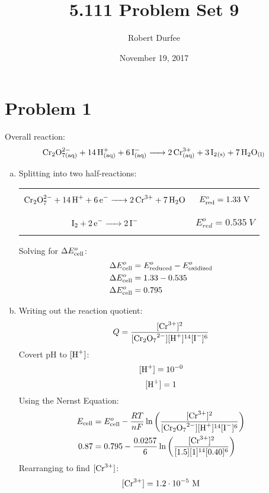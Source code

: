 \documentclass{article}
\title{ 5.111 Problem Set 9 }
\author{ Robert Durfee }
\date{ November 19, 2017 }
\begin{document}
\maketitle

\section*{ Problem 1 }

Overall reaction:
$$\ce{Cr_2O^{2-}_{7(aq)} + 14H^+_{(aq)} + 6I^-_{(aq)} -> 2Cr^{3+}_{(aq)} + 3I_2_{(s)} +
7H_2O_{(l)}}$$

\begin{enumerate}[a.]
    \item Splitting into two half-reactions:
        \begin{center}
            \begin{tabular}{c c}
                $$\ce{Cr_2O^{2-}_7 + 14H+ + 6e- -> 2Cr^{3+} + 7H_2O}$$ &
                $E^o_{\rm{red}}=1.33\ \si{V}$ \\
                $$\ce{I_2 + 2e- -> 2I^- }$$ & $E^o_{red}=0.535\ \si{V}$ 
            \end{tabular}
        \end{center}
        Solving for $\Delta E^o_{\rm{cell}}$:
        \begin{align*}
            \Delta E^o_{\rm{cell}} &= E^o_{\rm{reduced}} - E^o_{\rm{oxidized}} \\
            \Delta E^o_{\rm{cell}} &= 1.33 - 0.535 \\
            \Delta E^o_{\rm{cell}} &= 0.795
        \end{align*}
    \item Writing out the reaction quotient:
        $$Q=\frac{[\ce{Cr^{3+}}]^2}{[\ce{Cr_2O_7^{2-}}][\ce{H+}]^{14}[\ce{I-}]^6}$$
        Covert pH to $[\ce{H+}]$:
        $$[\ce{H+}] = 10^{-0}$$
        $$[\ce{H+}] = 1$$
        Using the Nernst Equation:
        \begin{align*}
            E_{\rm{cell}} &= E_{\rm{cell}}^o -
            \frac{RT}{nF}\ln\left(\frac{[\ce{Cr^{3+}}]^2}
            {[\ce{Cr_2O_7^{2-}}][\ce{H+}]^{14}[\ce{I-}]^6}\right) \\
            0.87 &= 0.795 - \frac{0.0257}{6}\ln\left(\frac{[\ce{Cr^{3+}}]^2}
            {[1.5][1]^{14}[0.40]^6}\right)
        \end{align*}
        Rearranging to find $[\ce{Cr^{3+}}]$:
        $$[\ce{Cr^{3+}}] = 1.2 \cdot 10^{-5}\ \si{M}$$
\end{enumerate}
\end{document}
